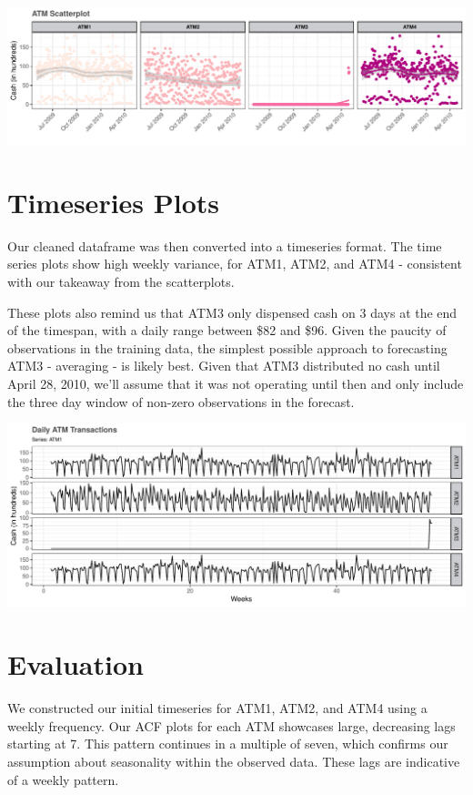 \documentclass[openany]{book}
\begin{document}
\includegraphics{Part-A-JM_JO_files/figure-latex/unnamed-chunk-3-1.pdf}

\hypertarget{timeseries-plots}{%
\section{Timeseries Plots}\label{timeseries-plots}}

Our cleaned dataframe was then converted into a timeseries format. The
time series plots show high weekly variance, for ATM1, ATM2, and ATM4 -
consistent with our takeaway from the scatterplots.

These plots also remind us that ATM3 only dispensed cash on 3 days at
the end of the timespan, with a daily range between \$82 and \$96. Given
the paucity of observations in the training data, the simplest possible
approach to forecasting ATM3 - averaging - is likely best. Given that
ATM3 distributed no cash until April 28, 2010, we'll assume that it was
not operating until then and only include the three day window of
non-zero observations in the forecast.

\includegraphics{Part-A-JM_JO_files/figure-latex/unnamed-chunk-4-1.pdf}

\hypertarget{evaluation}{%
\section{Evaluation}\label{evaluation}}

We constructed our initial timeseries for ATM1, ATM2, and ATM4 using a
weekly frequency. Our ACF plots for each ATM showcases large, decreasing
lags starting at 7. This pattern continues in a multiple of seven, which
confirms our assumption about seasonality within the observed data.
These lags are indicative of a weekly pattern.
\end{document}
